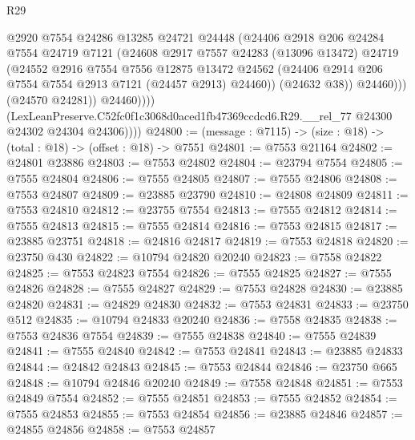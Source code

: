\begin{lexlean}{R29}
\begin{coremodule}
                        @2920
                        @7554
                        @24286
                        @13285
                        @24721
                        @24448
                        (@24406
                          @2918
                          @206
                          @24284
                          @7554
                          @24719
                          @7121
                          (@24608
                            @2917
                            @7557
                            @24283
                            (@13096 @13472)
                            @24719
                            (@24552
                              @2916
                              @7554
                              @7556
                              @12875
                              @13472
                              @24562
                              (@24406 @2914 @206 @7554 @7554 @2913 @7121 (@24457 @2913) @24460))
                            (@24632 @38))
                          @24460)))
                    (@24570 @24281))
                  @24460))))
          (LexLeanPreserve.C52fc0f1c3068d0aced1fb47369ccdcd6.R29.__rel_77
            @24300
            @24302
            @24304
            @24306))))
@24800 := (message : @7115) -> (size : @18) -> (total : @18) -> (offset : @18) -> @7551
@24801 := @7553 @21164
@24802 := @24801 @23886
@24803 := @7553 @24802
@24804 := @23794 @7554
@24805 := @7555 @24804
@24806 := @7555 @24805
@24807 := @7555 @24806
@24808 := @7553 @24807
@24809 := @23885 @23790
@24810 := @24808 @24809
@24811 := @7553 @24810
@24812 := @23755 @7554
@24813 := @7555 @24812
@24814 := @7555 @24813
@24815 := @7555 @24814
@24816 := @7553 @24815
@24817 := @23885 @23751
@24818 := @24816 @24817
@24819 := @7553 @24818
@24820 := @23750 @430
@24822 := @10794 @24820 @20240
@24823 := @7558 @24822
@24825 := @7553 @24823 @7554
@24826 := @7555 @24825
@24827 := @7555 @24826
@24828 := @7555 @24827
@24829 := @7553 @24828
@24830 := @23885 @24820
@24831 := @24829 @24830
@24832 := @7553 @24831
@24833 := @23750 @512
@24835 := @10794 @24833 @20240
@24836 := @7558 @24835
@24838 := @7553 @24836 @7554
@24839 := @7555 @24838
@24840 := @7555 @24839
@24841 := @7555 @24840
@24842 := @7553 @24841
@24843 := @23885 @24833
@24844 := @24842 @24843
@24845 := @7553 @24844
@24846 := @23750 @665
@24848 := @10794 @24846 @20240
@24849 := @7558 @24848
@24851 := @7553 @24849 @7554
@24852 := @7555 @24851
@24853 := @7555 @24852
@24854 := @7555 @24853
@24855 := @7553 @24854
@24856 := @23885 @24846
@24857 := @24855 @24856
@24858 := @7553 @24857

\end{coremodule}
\end{lexlean}
